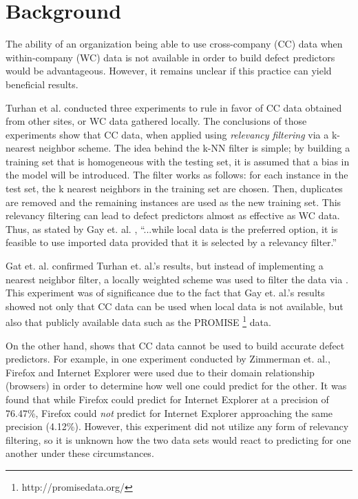 \documentclass{sig-alternate}
\begin{document}
\section{Background}

The ability of an organization being able to use cross-company (CC) data
when within-company (WC) data is not available in order to build
defect predictors would be advantageous. However, it remains unclear
if this practice can yield beneficial results.

Turhan et al. conducted three experiments to rule in favor of CC data obtained from other sites, or WC data gathered locally. The conclusions of those experiments show that CC data, when applied using {\em relevancy filtering} via a k-nearest neighbor scheme. The idea behind the k-NN filter is simple; by building a training set that is homogeneous with the testing set, it is assumed that a bias in the model will be introduced. The filter works as follows: for each instance in the test set, the k nearest neighbors in the training set are chosen. Then, duplicates are removed and the remaining instances are used as the new training set. This relevancy filtering can lead to defect predictors almost as effective as WC data. Thus, as stated by Gay et. al. \cite{gay09}, ``...while local data is the preferred option, it is feasible to use imported data provided that it is selected by a relevancy filter.''

Gat et. al. confirmed Turhan et. al.'s results, but instead of implementing a nearest neighbor filter, a locally weighted scheme was used to filter the data via \cite{hallLWL}. This experiment was of significance due to the fact that Gay et. al.'s results showed not only that CC data can be used when local data is not available, but also that publicly available data such as the PROMISE \footnote{http://promisedata.org/} data.

On the other hand, \cite{zimmerman09} shows that CC data cannot be used to build accurate defect predictors. For example, in one experiment conducted by Zimmerman et. al., Firefox and Internet Explorer were used due to their domain relationship (browsers) in order to determine how well one could predict for the other. It was found that while Firefox could predict for Internet Explorer at a precision of 76.47\%, Firefox could {\em not} predict for Internet Explorer approaching the same precision (4.12\%). However, this experiment did not utilize any form of relevancy filtering, so it is unknown how the two data sets would react to predicting for one another under these circumstances.
\end{document}
